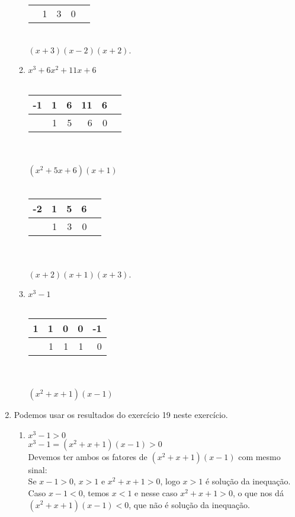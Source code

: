 \begin{enumerate}
\begin{enumerate}
\begin{tabular}{ l | r r r r }
				\hline
			    & 1 & 3 & 0 \\
			\end{tabular}
			\\
			$(x+3)(x-2)(x+2)$.
			\item %
			$x^3+6x^2+11x+6$
			\\
			\\
			\begin{tabular}{ l | r r r r r}
			  -1 & 1 & 6 & 11 & 6\\
				\hline
			    & 1 & 5 & 6 & 0 \\
			\end{tabular}
			\\
			\\
			$(x^2+5x+6)(x+1)$
			\\
			\\
			\begin{tabular}{ l | r r r r }
			  -2 & 1 & 5 & 6 \\
				\hline
			    & 1 & 3 & 0 \\
			\end{tabular}
			\\
			\\
			$(x+2)(x+1)(x+3)$.
			\item %
			$x^3-1$
			\\
			\\
			\begin{tabular}{ l | r r r r }
			  1 & 1 & 0 & 0 & -1 \\
				\hline
			    & 1 & 1 & 1 & 0 \\
			\end{tabular}
			\\
			\\
			$(x^2+x+1)(x-1)$
	\end{enumerate}
	\item %
		Podemos usar os resultados do exercício 19 neste exercício.
		\begin{enumerate}
		\item %
			$x^3 - 1 > 0 $\\
			$x^3 -1 = (x^2+x+1)(x-1) > 0$\\
			Devemos ter ambos os fatores de $(x^2+x+1)(x-1)$ com mesmo sinal:\\
			Se $x-1 > 0$, $x > 1$ e $x^2+x+1 >0$, logo $x > 1$ é solução da inequação.\\
			Caso $x - 1 < 0$, temos $x < 1$ e nesse caso $x^2 + x + 1 > 0$, o que nos dá $(x^2+x+1)(x-1) < 0$, que não é solução da inequação.\\

\end{enumerate}
\end{enumerate}
